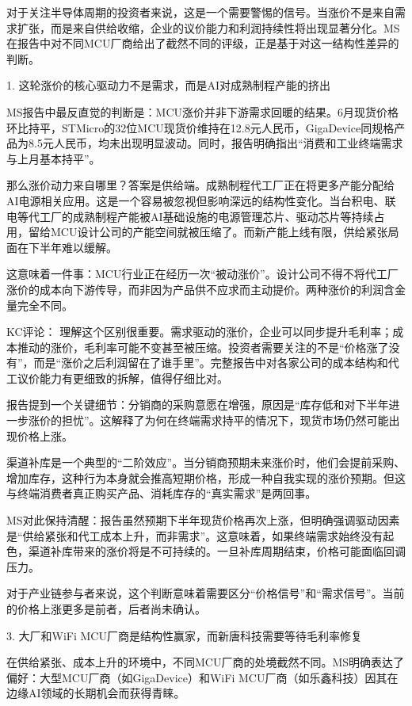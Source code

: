 \documentclass[11pt]{ctexart}
\begin{document}
对于关注半导体周期的投资者来说，这是一个需要警惕的信号。当涨价不是来自需求扩张，而是来自供给收缩，企业的议价能力和利润持续性将出现显著分化。MS在报告中对不同MCU厂商给出了截然不同的评级，正是基于对这一结构性差异的判断。

1. 这轮涨价的核心驱动力不是需求，而是AI对成熟制程产能的挤出

MS报告中最反直觉的判断是：MCU涨价并非下游需求回暖的结果。6月现货价格环比持平，STMicro的32位MCU现货价维持在12.8元人民币，GigaDevice同规格产品为8.5元人民币，均未出现明显波动。同时，报告明确指出“消费和工业终端需求与上月基本持平”。

那么涨价动力来自哪里？答案是供给端。成熟制程代工厂正在将更多产能分配给AI电源相关应用。这是一个容易被忽视但影响深远的结构性变化。当台积电、联电等代工厂的成熟制程产能被AI基础设施的电源管理芯片、驱动芯片等持续占用，留给MCU设计公司的产能空间就被压缩了。而新产能上线有限，供给紧张局面在下半年难以缓解。

这意味着一件事：MCU行业正在经历一次“被动涨价”。设计公司不得不将代工厂涨价的成本向下游传导，而非因为产品供不应求而主动提价。两种涨价的利润含金量完全不同。

KC评论： 理解这个区别很重要。需求驱动的涨价，企业可以同步提升毛利率；成本推动的涨价，毛利率可能不变甚至被压缩。投资者需要关注的不是“价格涨了没有”，而是“涨价之后利润留在了谁手里”。完整报告中对各家公司的成本结构和代工议价能力有更细致的拆解，值得仔细比对。

报告提到一个关键细节：分销商的采购意愿在增强，原因是“库存低和对下半年进一步涨价的担忧”。这解释了为何在终端需求持平的情况下，现货市场仍然可能出现价格上涨。

渠道补库是一个典型的“二阶效应”。当分销商预期未来涨价时，他们会提前采购、增加库存，这种行为本身就会推高短期价格，形成一种自我实现的涨价预期。但这与终端消费者真正购买产品、消耗库存的“真实需求”是两回事。

MS对此保持清醒：报告虽然预期下半年现货价格再次上涨，但明确强调驱动因素是“供给紧张和代工成本上升，而非需求”。这意味着，如果终端需求始终没有起色，渠道补库带来的涨价将是不可持续的。一旦补库周期结束，价格可能面临回调压力。

对于产业链参与者来说，这个判断意味着需要区分“价格信号”和“需求信号”。当前的价格上涨更多是前者，后者尚未确认。

3. 大厂和WiFi MCU厂商是结构性赢家，而新唐科技需要等待毛利率修复

在供给紧张、成本上升的环境中，不同MCU厂商的处境截然不同。MS明确表达了偏好：大型MCU厂商（如GigaDevice）和WiFi MCU厂商（如乐鑫科技）因其在边缘AI领域的长期机会而获得青睐。
\end{document}
